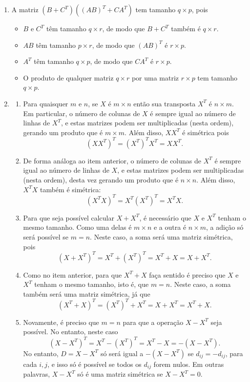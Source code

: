 \documentclass[12pt,a4paper]{article}
\begin{document}
\begin{enumerate}
\item A matriz $(B + C^T) ((AB)^T + CA^T)$ tem tamanho $q \times p$, pois
\begin{itemize}
\item $B$ e $C^T$ têm tamanho $q \times r$, de modo que $B + C^T$ também é $q \times r$.
\item $AB$ têm tamanho $p \times r$, de modo que $(AB)^T$ é $r \times p$.
\item $A^T$ têm tamanho $q \times p$, de modo que $CA^T$ é $r \times p$.
\item O produto de qualquer matriz $q \times r$ por uma matriz $r \times p$ tem tamanho $q \times p$.
\end{itemize}

\item
\begin{enumerate}
\item Para quaisquer $m$ e $n$, se $X$ é $m \times n$ então sua transposta $X^T$ é $n \times m$. Em particular, o número de colunas de $X$ é sempre igual ao número de linhas de $X^T$, e estas matrizes podem ser multiplicadas (nesta ordem), gerando um produto que é $m \times m$. Além disso, $X X^T$ é simétrica pois
\[
(X X^T)^T = (X^T)^T X^T = X X^T.
\]
\item De forma análoga ao item anterior, o número de colunas de $X^T$ é sempre igual ao número de linhas de $X$, e estas matrizes podem ser multiplicadas (nesta ordem), desta vez gerando um produto que é $n \times n$. Além disso, $X^T X$ também é simétrica:
\[
(X^T X)^T = X^T (X^T)^T = X^T X.
\]
\item Para que seja possível calcular $X + X^T$, é necessário que $X$ e $X^T$ tenham o mesmo tamanho. Como uma delas é $m \times n$ e a outra é $n \times m$, a adição só será possível se $m = n$. Neste caso, a soma será uma matriz simétrica, pois
\[
(X + X^T)^T = X^T + (X^T)^T = X^T + X = X + X^T.
\]
\item Como no item anterior, para que $X^T + X$ faça sentido é preciso que $X$ e $X^T$ tenham o mesmo tamanho, isto é, que $m = n$. Neste caso, a soma também será uma matriz simétrica, já que
\[
(X^T + X)^T = (X^T)^T + X^T = X + X^T = X^T + X.
\]
\item Novamente, é preciso que $m=n$ para que a operação $X - X^T$ seja possível. No entanto, neste caso
\[
(X - X^T)^T = X^T - (X^T)^T = X^T - X = -(X - X^T).
\]
No entanto, $D = X - X^T$ só será igual a $-(X - X^T)$ se $d_{ij} = -d_{ij}$, para cada $i,j$, e isso só é possível se todos os $d_{ij}$ forem nulos. Em outras palavras, $X - X^T$ só é uma matriz simétrica se $X - X^T = 0$.
\end{enumerate}


\end{enumerate}
\end{document}
